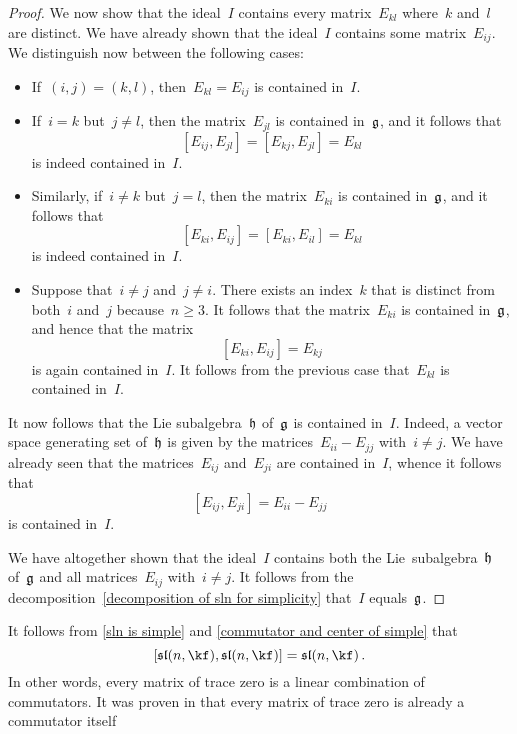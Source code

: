 \begin{proof}
	We now show that the ideal~$I$ contains every matrix~$E_{kl}$ where~$k$ and~$l$ are distinct.
	We have already shown that the ideal~$I$ contains some matrix~$E_{ij}$.
	We distinguish now between the following cases:
	\begin{itemize}
		\item
			If~$(i,j) = (k,l)$, then~$E_{kl} = E_{ij}$ is contained in~$I$.
		\item
			If~$i = k$ but~$j \neq l$, then the matrix~$E_{jl}$ is contained in~$\mathfrak{g}$, and it follows that
			\[
				[ E_{ij}, E_{jl} ]
				=
				[ E_{kj}, E_{jl} ]
				=
				E_{kl}
			\]
			is indeed contained in~$I$.
		\item
			Similarly, if~$i \neq k$ but~$j = l$, then the matrix~$E_{ki}$ is contained in~$\mathfrak{g}$, and it follows that
			\[
				[ E_{ki}, E_{ij} ]
				=
				[ E_{ki}, E_{il} ]
				=
				E_{kl}
			\]
			is indeed contained in~$I$.
		\item
			Suppose that~$i \neq j$ and~$j \neq i$.
			There exists an index~$k$ that is distinct from both~$i$ and~$j$ because~$n \geq 3$.
			It follows that the matrix~$E_{ki}$ is contained in~$\mathfrak{g}$, and hence that the matrix
			\[
				[E_{ki}, E_{ij}]
				=
				E_{kj}
			\]
			is again contained in~$I$.
			It follows from the previous case that~$E_{kl}$ is contained in~$I$.
	\end{itemize}
	It now follows that the Lie subalgebra~$\mathfrak{h}$ of~$\mathfrak{g}$ is contained in~$I$.
	Indeed, a vector space generating set of~$\mathfrak{h}$ is given by the matrices~$E_{ii} - E_{jj}$ with~$i \neq j$.
	We have already seen that the matrices~$E_{ij}$ and~$E_{ji}$ are contained in~$I$, whence it follows that
	\[
		[E_{ij}, E_{ji}]
		=
		E_{ii} - E_{jj}
	\]
	is contained in~$I$.

	We have altogether shown that the ideal~$I$ contains both the Lie~subalgebra~$\mathfrak{h}$ of~$\mathfrak{g}$ and all matrices~$E_{ij}$ with~$i \neq j$.
	It follows from the decomposition~\eqref{decomposition of sln for simplicity} that~$I$ equals~$\mathfrak{g}$.
\end{proof}


\begin{remark}
	It follows from \cref{sln is simple} and \cref{commutator and center of simple} that
	\[
		[\sllie(n, \kf), \sllie(n, \kf)]
		=
		\sllie(n, \kf) \,.
	\]
	In other words, every matrix of trace zero is a linear combination of commutators.
	It was proven in \cite{albert_muckenhoupt_matrices_trace_zero} that every matrix of trace zero is already a commutator itself
\end{remark}





